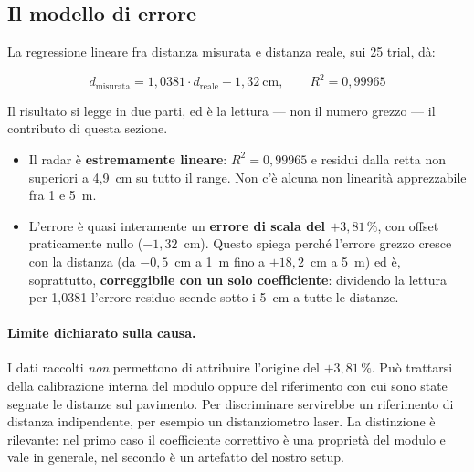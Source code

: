 
\subsection{Il modello di errore}

La regressione lineare fra distanza misurata e distanza reale, sui 25 trial, dà:

\begin{equation}
d_{\text{misurata}} = 1{,}0381 \cdot d_{\text{reale}} - 1{,}32~\text{cm},
\qquad R^2 = 0{,}99965
\label{eq:regressione}
\end{equation}

Il risultato si legge in due parti, ed è la lettura --- non il numero grezzo --- il
contributo di questa sezione.

\begin{itemize}[leftmargin=1.4em,itemsep=3pt]
  \item Il radar è \textbf{estremamente lineare}: $R^2 = 0{,}99965$ e residui dalla
        retta non superiori a 4,9~cm su tutto il range. Non c'è alcuna non linearità
        apprezzabile fra 1 e 5~m.
  \item L'errore è quasi interamente un \textbf{errore di scala del $+3{,}81\,\%$},
        con offset praticamente nullo ($-1{,}32$~cm). Questo spiega perché l'errore
        grezzo cresce con la distanza (da $-0{,}5$~cm a 1~m fino a $+18{,}2$~cm a
        5~m) ed è, soprattutto, \textbf{correggibile con un solo coefficiente}:
        dividendo la lettura per 1,0381 l'errore residuo scende sotto i 5~cm a tutte
        le distanze.
\end{itemize}

\paragraph{Limite dichiarato sulla causa.} I dati raccolti \emph{non} permettono di
attribuire l'origine del $+3{,}81\,\%$. Può trattarsi della calibrazione interna del
modulo oppure del riferimento con cui sono state segnate le distanze sul pavimento.
Per discriminare servirebbe un riferimento di distanza indipendente, per esempio un
distanziometro laser. La distinzione è rilevante: nel primo caso il coefficiente
correttivo è una proprietà del modulo e vale in generale, nel secondo è un artefatto
del nostro setup.

